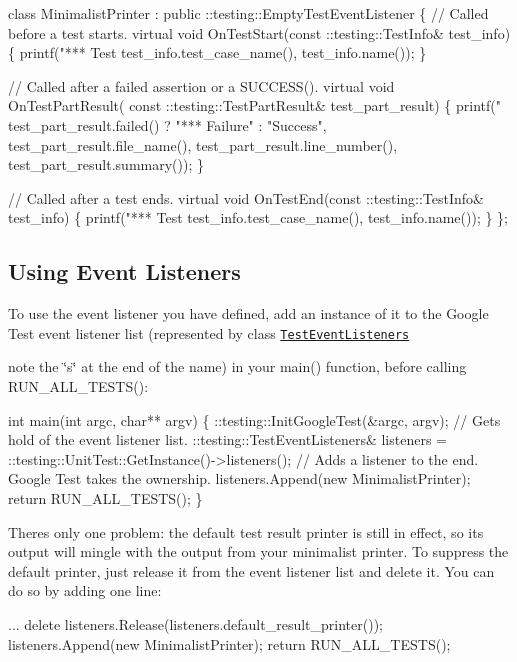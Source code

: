 \begin{DoxyCode}
class MinimalistPrinter : public ::testing::EmptyTestEventListener \{
  // Called before a test starts.
  virtual void OnTestStart(const ::testing::TestInfo& test\_info) \{
    printf("*** Test %
           test\_info.test\_case\_name(), test\_info.name());
  \}

  // Called after a failed assertion or a SUCCESS().
  virtual void OnTestPartResult(
      const ::testing::TestPartResult& test\_part\_result) \{
    printf("%
           test\_part\_result.failed() ? "*** Failure" : "Success",
           test\_part\_result.file\_name(),
           test\_part\_result.line\_number(),
           test\_part\_result.summary());
  \}

  // Called after a test ends.
  virtual void OnTestEnd(const ::testing::TestInfo& test\_info) \{
    printf("*** Test %
           test\_info.test\_case\_name(), test\_info.name());
  \}
\};
\end{DoxyCode}


\subsection*{Using Event Listeners}

To use the event listener you have defined, add an instance of it to the Google Test event listener list (represented by class \href{../include/gtest/gtest.h#L929}{\tt Test\+Event\+Listeners}
\begin{DoxyItemize}
\item note the \char`\"{}s\char`\"{} at the end of the name) in your {\ttfamily main()} function, before calling {\ttfamily R\+U\+N\+\_\+\+A\+L\+L\+\_\+\+T\+E\+S\+T\+S()}\+: 
\begin{DoxyCode}
int main(int argc, char** argv) \{
  ::testing::InitGoogleTest(&argc, argv);
  // Gets hold of the event listener list.
  ::testing::TestEventListeners& listeners =
      ::testing::UnitTest::GetInstance()->listeners();
  // Adds a listener to the end.  Google Test takes the ownership.
  listeners.Append(new MinimalistPrinter);
  return RUN\_ALL\_TESTS();
\}
\end{DoxyCode}

\end{DoxyItemize}

There\textquotesingle{}s only one problem\+: the default test result printer is still in effect, so its output will mingle with the output from your minimalist printer. To suppress the default printer, just release it from the event listener list and delete it. You can do so by adding one line\+: 
\begin{DoxyCode}
...
delete listeners.Release(listeners.default\_result\_printer());
listeners.Append(new MinimalistPrinter);
return RUN\_ALL\_TESTS();
\end{DoxyCode}


